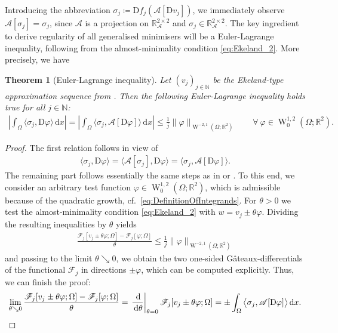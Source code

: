 \documentclass[a4paper,10pt,reqno,oneside]{amsart}
\numberwithin{equation}{section}
\newcommand{\R}{\mathbb R}
\newcommand{\N}{\mathbb N}
\newcommand{\A}{\mathscr{A}}
\newcommand{\sobo}{\operatorname{W}}
\newcommand{\D}{\mathrm{D}}
\newcommand{\dx}[1]{\,\mathrm{d}#1}
\newcommand{\skalarProd}[2]{\big\langle#1,#2\big\rangle}
\newcommand{\F}{\mathscr{F}}
\newtheorem{thm}{Theorem}[section]
\begin{document}
\noindent Introducing the abbreviation $\sigma_j\coloneqq \D f_j(\A[\D v_j])$, we immediately observe $\A[\sigma_j]=  \sigma_j$, since $\A$ is a projection on $\R^{2\times 2}_\A$ and $\sigma_j\in\R^{2\times 2}_{\A}$. 
The key ingredient to derive regularity of all generalised minimisers will be a Euler-Lagrange inequality, following from the almost-minimality condition \eqref{eq:Ekeland_2}. More precisely, we have 
\begin{thm}[Euler-Lagrange inequality]\label{thm:EulerLagrangeInequality}
	Let $(v_j)_{j\in\N}$ be the Ekeland-type approximation sequence from . Then the following \emph{Euler-Lagrange inequality} holds true for all $j\in\N$:
	\begin{align}\label{eq:EulerLagrangeInequality}
		\left\vert \int_\Omega \skalarProd{\sigma_j}{\D \varphi}\dx{x}\right\vert =\left\vert \int_\Omega \skalarProd{\sigma_j}{\A[\D \varphi]}\dx{x}\right\vert \leq \frac{1}{j}\|\varphi\|_{\sobo^{-2,1}(\Omega;\R^2)} \qquad \forall\ \varphi\in\sobo^{1,2}_0(\Omega;\R^2).
	\end{align}
\end{thm}
\begin{proof}
	The first relation follows in view of
	\begin{align*}
		\skalarProd{\sigma_j}{\D \varphi}=\skalarProd{\A[\sigma_j]}{\D\varphi}=\skalarProd{\sigma_j}{\A[\D\varphi]}.
	\end{align*}
	The remaining part follows essentially the same steps as in \cite[(4.13)]{Gmeineder} or \cite[Lemma 4.4]{Piotr}. To this end, we consider an arbitrary test function $\varphi\in\sobo^{1,2}_0(\Omega;\R^2)$, which is admissible because of the quadratic growth, cf.~\eqref{eq:DefinitionOfIntegrands}.  For $\theta>0$ we test the almost-minimality condition \eqref{eq:Ekeland_2} with $w=v_j\pm \theta \varphi$. Dividing the resulting inequalities by $\theta$ yields
	\begin{align*}
		\frac{\F_j[v_j\pm \theta\varphi; \Omega]- \F_j [\varphi;\Omega]}{\theta}\leq \frac{1}{j}\|\varphi\|_{\sobo^{-2,1}(\Omega;\R^2)}
	\end{align*}
	and passing to the limit $\theta\searrow 0$, we obtain the two one-sided Gâteaux-differentials of the functional $\F_j$ in directions $\pm\varphi$, which can be computed explicitly. Thus, we can finish the proof:
	\begin{equation*}
		\lim_{\theta\searrow 0} \frac{\F_j[v_j\pm \theta\varphi; \Omega]- \F_j [\varphi;\Omega]}{\theta} = \left.\frac{\dx{}}{\dx{\theta}}\right\vert_{\theta=0} \F_j[v_j \pm \theta \varphi;\Omega] = \pm\int_\Omega  \skalarProd{\sigma_j}{\A[\D \varphi]}\dx{x}.\qedhere
	\end{equation*}
\end{proof}
\end{document}
